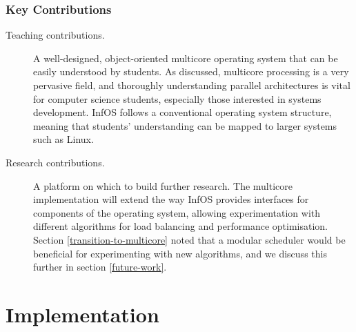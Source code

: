 \documentclass[bsc,frontabs,singlespacing,parskip,deptreport]{infthesis}     %
\begin{document}
\subsection{Key Contributions} \label{key-contributions}
\begin{description}
    \item [Teaching contributions.] A well-designed, object-oriented multicore operating system that can be easily understood by students. As discussed, multicore processing is a very pervasive field, and thoroughly understanding parallel architectures is vital for computer science students, especially those interested in systems development. InfOS follows a conventional operating system structure, meaning that students' understanding can be mapped to larger systems such as Linux.
    \item [Research contributions.] A platform on which to build further research. The multicore implementation will extend the way InfOS provides interfaces for components of the operating system, allowing experimentation with different algorithms for load balancing and performance optimisation. Section \ref{transition-to-multicore} noted that a modular scheduler would be beneficial for experimenting with new algorithms, and we discuss this further in section \ref{future-work}.
\end{description}

\chapter{Implementation} \label{implementation}
\end{document}
